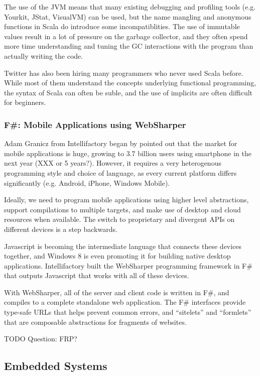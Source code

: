 \documentclass{jfp1}
\begin{document}
The use of the JVM means that many existing debugging and profiling tools (e.g.
Yourkit, JStat, VisualVM) can be used, but the name mangling and anonymous
functions in Scala do introduce some incompatiblities.  The use of immutable
values result in a lot of pressure on the garbage collector, and they often
spend more time understanding and tuning the GC interactions with the program
than actually writing the code.

Twitter has also been hiring many programmers who never used Scala before.
While most of them understand the concepts underlying functional programming,
the syntax of Scala can often be suble, and the use of implicits are often
difficult for beginners.

\subsubsection{F\#: Mobile Applications using WebSharper}

Adam Granicz from Intellifactory began by pointed out that the market for
mobile applications is huge, growing to 3.7 billion users using smartphone in
the next year (XXX or 5 years?).  However, it requires a very heterogenous
programming style and choice of language, as every current platform differs
significantly (e.g. Android, iPhone, Windows Mobile).

Ideally, we need to program mobile applications using higher level
abstractions, support compilations to multiple targets, and make use of desktop
and cloud resources when available. The switch to proprietary and divergent 
APIs on different devices is a step backwards.

Javascript is becoming the intermediate language that connects these devices
together, and Windows 8 is even promoting it for building native desktop
applications. Intellifactory built the WebSharper programming framework in F\#
that outputs Javascript that works with all of these devices.

With WebSharper, all of the server and client code is written in F\#, and
compiles to a complete standalone web application. The F\# interfaces provide
type-safe URLs that helps prevent common errors, and ``sitelets'' and
``formlets'' that are composable abstractions for fragments of websites.

TODO Question: FRP?

\subsection{Embedded Systems}
\end{document}
